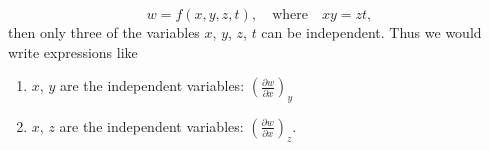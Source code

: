 \begin{example}
\begin{equation*}
  w = f(x, y, z, t), \quad \textrm{where}\quad xy=zt,
\end{equation*}
then only three of the variables $x$, $y$, $z$, $t$ can be independent.
Thus we would write expressions like

\begin{enumerate}[label=(\alph*), wide, itemsep =0pt]
\item  $x$, $y$ are the independent variables: $\left(\frac{\partial w}{\partial x}\right)_y$
\item  $x$, $z$ are the independent variables: $\left(\frac{\partial w}{\partial x}\right)_z$.
\end{enumerate}

\end{example}
